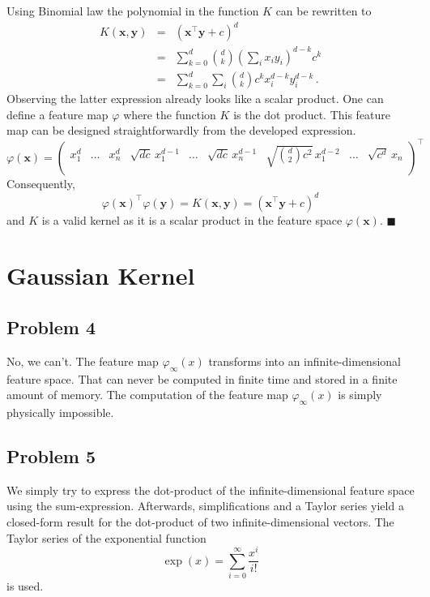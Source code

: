 \documentclass{scrartcl}
\newcommand{\qed}{\hfill $\blacksquare$}
\begin{document}
Using Binomial law the polynomial in the function $K$ can be rewritten to
\begin{eqnarray}
	K(\mathbf{x}, \mathbf{y}) &=& (\mathbf{x}^\top \mathbf{y} + c)^d\\
	&=& \sum\limits_{k=0}^d \binom{d}{k} \left(\sum\limits_i x_i y_i\right)^{d-k} c^k\\
	&=& \sum\limits_{k=0}^{d}\sum\limits_i \binom{d}{k} c^k x_i^{d-k}y_i^{d-k}\, .
\end{eqnarray}
Observing the latter expression already looks like a scalar product. One can define a feature map $\varphi$ where the function $K$ is the dot product. This feature map can be designed straightforwardly from the developed expression.
\begin{equation}
	\varphi(\mathbf{x}) = \begin{pmatrix}
		x_1^d & \ldots & x_n^d & \sqrt{dc}\,x_1^{d-1} & \ldots & \sqrt{dc}\,x_n^{d-1} & \sqrt{\binom{d}{2}c^2}\,x_1^{d-2} & \ldots & \sqrt{c^d}\, x_n\\
	\end{pmatrix}^\top
\end{equation} 
Consequently,
\begin{equation}
	\varphi(\mathbf{x})^\top \varphi(\mathbf{y}) = K(\mathbf{x}, \mathbf{y}) = (\mathbf{x}^\top \mathbf{y} + c)^d
\end{equation}
and $K$ is a valid kernel as it is a scalar product in the feature space $\varphi(\mathbf{x})$. \qed

\section{Gaussian Kernel}

\subsection{Problem 4}
No, we can't. The feature map $\varphi_\infty (x)$ transforms into an infinite-dimensional feature space. That can never be computed in finite time and stored in a finite amount of memory. The computation of the feature map $\varphi_\infty(x)$ is simply physically impossible.

\subsection{Problem 5}
We simply try to express the dot-product of the infinite-dimensional feature space using the sum-expression. Afterwards, simplifications and a Taylor series yield a closed-form result for the dot-product of two infinite-dimensional vectors. The Taylor series of the exponential function 
\begin{equation}\label{exp}
	\exp (x) = \sum\limits_{i=0}^\infty \frac{x^i}{i!}
\end{equation}
is used.
\end{document}

